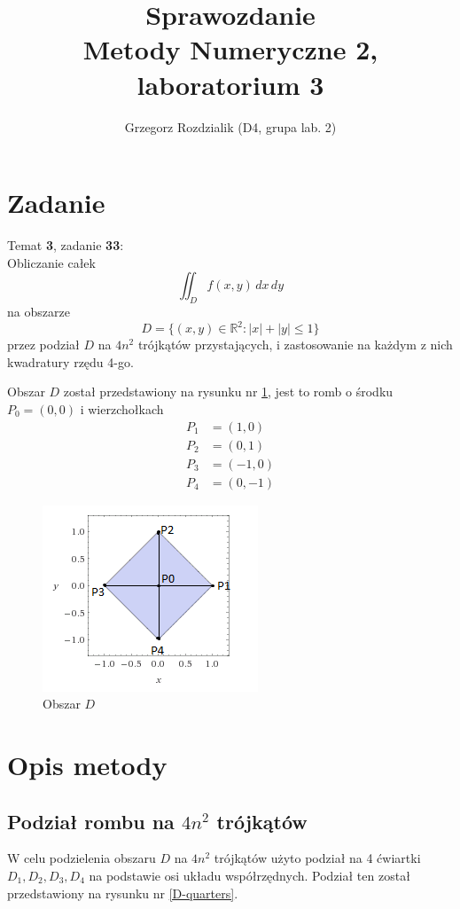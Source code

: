 \documentclass[12pt]{article}
\begin{document}
	\title{Sprawozdanie\\Metody Numeryczne 2, laboratorium 3}
	\author{Grzegorz Rozdzialik (D4, grupa lab. 2)}
	\maketitle	
	
	\section{Zadanie}
	{\Large Temat \textbf{3}, zadanie \textbf{33}:}\\
	Obliczanie całek\
	$$\iint_D f(x, y) \,dx\,dy$$
	na obszarze
	$$D = \{(x, y) \in \mathbb{R}^2: |x| + |y| \leq 1\}$$
	przez podział $D$ na $4n^2$ trójkątów przystających, i zastosowanie na każdym z nich kwadratury rzędu 4-go.
	
	Obszar $D$ został przedstawiony na rysunku nr \ref{D-area}, jest to romb o środku $P_0 = (0, 0)$ i wierzchołkach
	\begin{align*}
		P_1 & = (1, 0)  \\
		P_2 & = (0, 1)  \\
		P_3 & = (-1, 0) \\
		P_4 & = (0, -1)
	\end{align*}
	
	\begin{figure}[H]
		\centering
		\includegraphics[scale=1.5]{images/D-area.png}
		\caption{Obszar $D$}
		\label{D-area}
	\end{figure}

	
	\section{Opis metody}
	\subsection{Podział rombu na $4n^2$ trójkątów}
	W celu podzielenia obszaru $D$ na $4n^2$ trójkątów użyto podział na 4 ćwiartki $D_1, D_2, D_3, D_4$ na podstawie osi układu współrzędnych. Podział ten został przedstawiony na rysunku nr \ref{D-quarters}.
	
\end{document}
